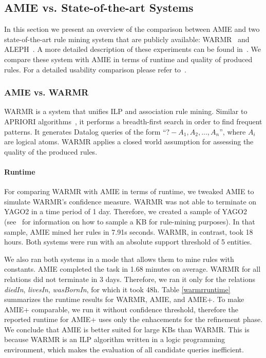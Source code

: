 




\subsection{AMIE vs. State-of-the-art Systems} \label{competitors}

In this section we present an overview of the comparison between AMIE and two state-of-the-art rule mining system that are publicly available:
WARMR~\cite{GoeVan02} and ALEPH~\cite{Muggleton:1996:LPD:647996.742465}. A more detailed description of these experiments can be found in~\cite{amie}.
We compare these system with AMIE in terms of runtime and quality of produced rules. For a detailed usability comparison please refer to~\cite{amie}.

\subsubsection{AMIE vs. WARMR}
WARMR is a system that unifies ILP and association rule mining. Similar to APRIORI algorithms~\cite{Agrawal:1996:FDA:257938.257975}, it performs a
breadth-first search in order to find frequent patterns.
It generates Datalog queries of the form ``$?-A_1,A_2,...,A_n$'',
where $A_i$ are logical atoms. WARMR applies a closed world assumption for assessing the quality of the produced rules.

\paragraph{Runtime}
For comparing WARMR with AMIE in terms of runtime, we tweaked AMIE to simulate WARMR's confidence measure.  
WARMR was not able to terminate on YAGO2 in a time period of 1 day. Therefore, we created a sample of YAGO2 
(see~\cite{amie} for information on how to sample a KB for rule-mining purposes).
In that sample, AMIE mined her rules in 7.91s seconds.
WARMR, in contrast, took 18 hours. Both systems were run with an absolute support threshold of 5 entities.

We also ran both systems in a mode that allows them to mine rules with constants. 
AMIE completed the task in 1.68 minutes on average. WARMR for all relations did not terminate in 3 days.
Therefore, we ran it only for the relations \textit{diedIn}, \textit{livesIn}, \textit{wasBornIn}, for which it took 48h. 
Table \ref{warmrruntime} summarizes the runtime results for WARMR, AMIE, and AMIE+. To make AMIE+ comparable, 
we run it without confidence threshold, therefore the reported runtime for AMIE+ uses only the enhacements for the refinement phase.
We conclude that AMIE is better suited for large KBs than WARMR.
This is because WARMR is an ILP algorithm written in a logic programming environment, 
which makes the evaluation of all candidate queries inefficient.\\


